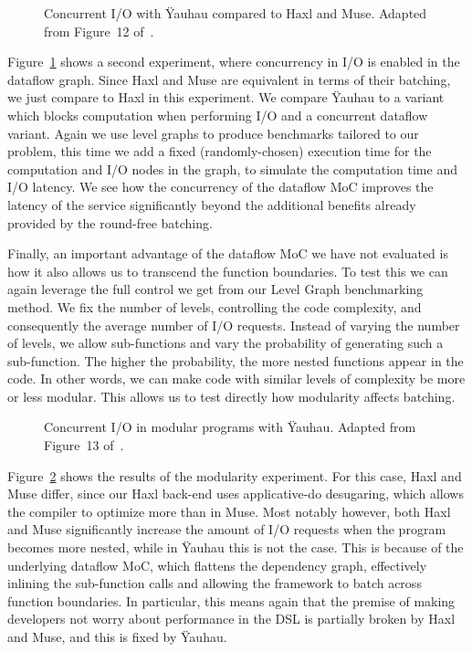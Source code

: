 \begin{figure}[t]
    	\centering
		\caption{Concurrent \ac{I/O} with \"{Y}auhau compared to Haxl and Muse. Adapted from Figure~12 of~\cite{ertel_cc18}.}	
		\label{fig:yauhau_io-imbalance}
	\end{figure}

Figure~\ref{fig:yauhau_io-imbalance} shows a second experiment, where concurrency in \ac{I/O} is enabled in the dataflow graph.
Since Haxl and Muse are equivalent in terms of their batching, we just compare to Haxl in this experiment.
We compare \"{Y}auhau to a variant which blocks computation when performing \ac{I/O} and a concurrent dataflow variant.
Again we use level graphs to produce benchmarks tailored to our problem, this time we add a fixed (randomly-chosen) execution time for the computation and \ac{I/O} nodes in the graph, to simulate the computation time and \ac{I/O} latency.
We see how the concurrency of the dataflow \ac{MoC} improves the latency of the service significantly beyond the additional benefits already provided by the round-free batching.

Finally, an important advantage of the dataflow \ac{MoC} we have not evaluated is how it also allows us to transcend the function boundaries.
To test this we can again leverage the full control we get from our Level Graph benchmarking method.
We fix the number of levels, controlling the code complexity, and consequently the average number of \ac{I/O} requests.
Instead of varying the number of levels, we allow sub-functions and vary the probability of generating such a sub-function.
The higher the probability, the more nested functions appear in the code.
In other words, we can make code with similar levels of complexity be more or less modular.
This allows us to test directly how modularity affects batching.

\begin{figure}[t]
	\centering
	\caption{Concurrent \ac{I/O} in modular programs with \"{Y}auhau. Adapted from Figure~13 of~\cite{ertel_cc18}.}
	\label{fig:yauhau_efficient-modularity}
\end{figure}

Figure~\ref{fig:yauhau_efficient-modularity} shows the results of the modularity experiment.
For this case, Haxl and Muse differ, since our Haxl back-end uses applicative-do desugaring, which allows the compiler to optimize more than in Muse.
Most notably however, both Haxl and Muse significantly increase the amount of \ac{I/O} requests when the program becomes more nested, while in \"{Y}auhau this is not the case.
This is because of the underlying dataflow \ac{MoC}, which flattens the dependency graph, effectively inlining the sub-function calls and allowing the framework to batch across function boundaries.
In particular, this means again that the premise of making developers not worry about performance in the \ac{DSL} is partially broken by Haxl and Muse, and this is fixed by \"{Y}auhau.

